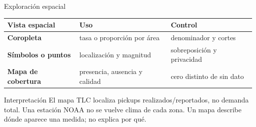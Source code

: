 \documentclass[aspectratio=169,11pt]{beamer}
\begin{document}
\begin{frame}{Exploración espacial}
  \small
  \begin{tabularx}{\textwidth}{>{\bfseries}p{} p{} X}
    \toprule
    Vista espacial & Uso & Control \\
    \midrule
    Coropleta & tasa o proporción por área & denominador y cortes \\
    Símbolos o puntos & localización y magnitud & sobreposición y privacidad \\
    Mapa de cobertura & presencia, ausencia y calidad & cero distinto de sin dato \\
    \bottomrule
  \end{tabularx}
  \vspace{.6em}
  \centering
  \vspace{.3em}
  \begin{alertblock}{Interpretación}
    El mapa TLC localiza pickups realizados/reportados, no demanda total. Una estación NOAA no se vuelve clima de cada zona. Un mapa describe dónde aparece una medida; no explica por qué.
  \end{alertblock}
\end{frame}
\end{document}
